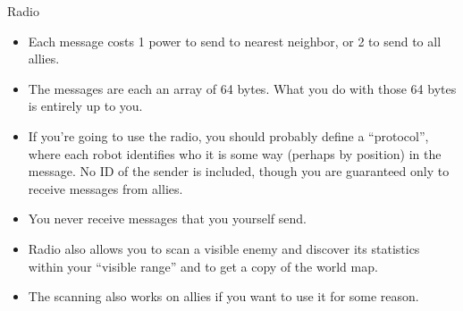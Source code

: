 \documentclass[aspectratio=169]{beamer}
\begin{document}
\begin{frame}{Radio}
  \begin{itemize}
  \item Each message costs 1 power to send to nearest neighbor, or 2
    to send to all allies.
  \item The messages are each an array of 64 bytes.  What you do with
    those 64 bytes is entirely up to you.
  \item If you're going to use the radio, you should probably define a
    ``protocol'', where each robot identifies who it is some way
    (perhaps by position) in the message.  No ID of the sender is
    included, though you are guaranteed only to receive messages from
    allies.
  \item You never receive messages that you yourself send.
  \item Radio also allows you to scan a visible enemy and discover its
    statistics within your ``visible range'' and to get a copy of the
    world map.
  \item The scanning also works on allies if you want to use it for
    some reason.
  \end{itemize}
\end{frame}
    
\end{document}
